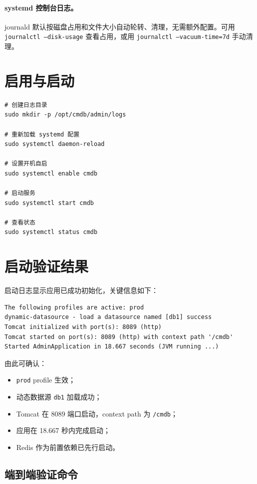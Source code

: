 \documentclass[12pt,a4paper]{ctexart}
\begin{document}
\paragraph{systemd 控制台日志。}
journald 默认按磁盘占用和文件大小自动轮转、清理，无需额外配置。可用 \texttt{journalctl --disk-usage} 查看占用，或用 \texttt{journalctl --vacuum-time=7d} 手动清理。

\section{启用与启动}

\begin{lstlisting}[style=shell]
# 创建日志目录
sudo mkdir -p /opt/cmdb/admin/logs

# 重新加载 systemd 配置
sudo systemctl daemon-reload

# 设置开机自启
sudo systemctl enable cmdb

# 启动服务
sudo systemctl start cmdb

# 查看状态
sudo systemctl status cmdb
\end{lstlisting}

\section{启动验证结果}

启动日志显示应用已成功初始化，关键信息如下：

\begin{lstlisting}[style=log]
The following profiles are active: prod
dynamic-datasource - load a datasource named [db1] success
Tomcat initialized with port(s): 8089 (http)
Tomcat started on port(s): 8089 (http) with context path '/cmdb'
Started AdminApplication in 18.667 seconds (JVM running ...)
\end{lstlisting}

由此可确认：

\begin{itemize}[leftmargin=2em]
  \item \texttt{prod} profile 生效；
  \item 动态数据源 \texttt{db1} 加载成功；
  \item Tomcat 在 8089 端口启动，context path 为 \texttt{/cmdb}；
  \item 应用在 18.667 秒内完成启动；
  \item Redis 作为前置依赖已先行启动。
\end{itemize}

\subsection{端到端验证命令}
\end{document}
